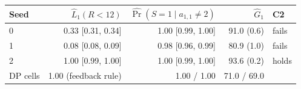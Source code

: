 \begin{tabular}{lrrrl}
\toprule
Seed & $\hat L_1(R<12)$ & $\widehat{\Pr}(S=1\mid a_{1,1}\ne 2)$ & $\hat G_1$ & C2 \\
\midrule
0 & 0.33 [0.31, 0.34] & 1.00 [0.99, 1.00] & 91.0 (0.6) & fails \\
1 & 0.08 [0.08, 0.09] & 0.98 [0.96, 0.99] & 80.9 (1.0) & fails \\
2 & 1.00 [0.99, 1.00] & 1.00 [0.99, 1.00] & 93.6 (0.2) & holds \\
\midrule
DP cells & 1.00 (feedback rule) & 1.00 / 1.00 & 71.0 / 69.0 & \\
\bottomrule
\end{tabular}
